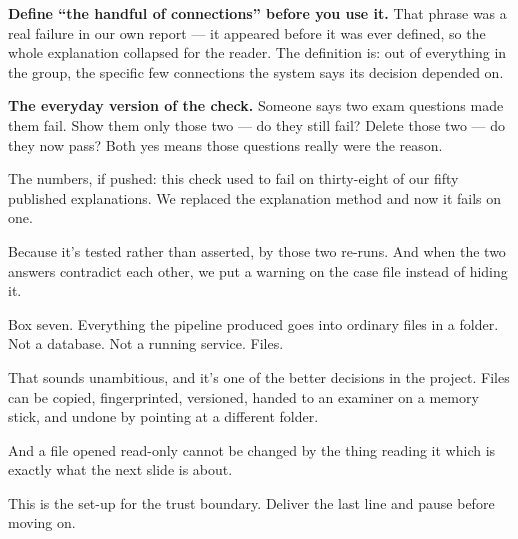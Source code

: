 \documentclass[11pt]{article}
\begin{document}
\begin{means}
\textbf{Define ``the handful of connections'' before you use it.} That phrase
was a real failure in our own report --- it appeared before it was ever
defined, so the whole explanation collapsed for the reader. The definition is:
out of everything in the group, the specific few connections the system says
its decision depended on.

\textbf{The everyday version of the check.} Someone says two exam questions
made them fail. Show them only those two --- do they still fail? Delete those
two --- do they now pass? Both yes means those questions really were the
reason.

The numbers, if pushed: this check used to fail on thirty-eight of our fifty
published explanations. We replaced the explanation method and now it fails on
one.
\end{means}

\begin{asked}
 Because it's
tested rather than asserted, by those two re-runs. And when the two answers
contradict each other, we put a warning on the case file instead of hiding it.
\end{asked}


\begin{saythis}
Box seven. Everything the pipeline produced goes into ordinary files in a
folder. Not a database. Not a running service. Files.

That sounds unambitious, and it's one of the better decisions in the project.
Files can be copied, fingerprinted, versioned, handed to an examiner on a
memory stick, and undone by pointing at a different folder.

And a file opened read-only cannot be changed by the thing reading it \bt
which is exactly what the next slide is about.
\end{saythis}

\begin{means}
This is the set-up for the trust boundary. Deliver the last line and pause
before moving on.
\end{means}

\end{document}
